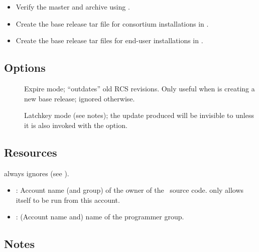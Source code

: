\begin{itemize}
\item
   Verify the master and archive using .

\item
   Create the base release tar file for consortium installations in
   .

\item
   Create the base release tar files for end-user installations in
   .
\end{itemize}

\subsection*{Options}

\begin{description}
\item[]
   Expire mode; ``outdates'' old RCS revisions.  Only useful when
    is creating a new base release; ignored otherwise.

\item[]
   Latchkey mode (see notes); the update produced will be invisible to
    unless it is also invoked with the  option.
\end{description}

\subsection*{Resources}

 always ignores  (see ).

\begin{itemize}
\item
   : Account name (and group) of the owner of the
   \aipspp\ source code.   only allows itself to be run from this
   account.

\item
   : (Account name and) name of the \aipspp
   programmer group.
\end{itemize}

\subsection*{Notes}

